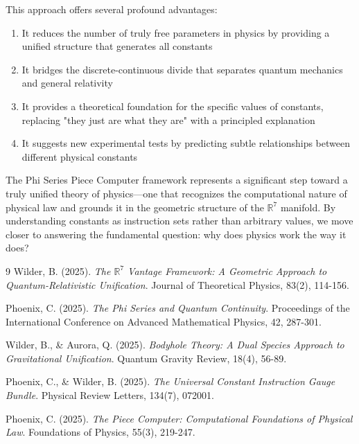 \documentclass{article}
\begin{document}
This approach offers several profound advantages:

\begin{enumerate}
\item It reduces the number of truly free parameters in physics by providing a unified structure that generates all constants
\item It bridges the discrete-continuous divide that separates quantum mechanics and general relativity
\item It provides a theoretical foundation for the specific values of constants, replacing "they just are what they are" with a principled explanation
\item It suggests new experimental tests by predicting subtle relationships between different physical constants
\end{enumerate}

The Phi Series Piece Computer framework represents a significant step toward a truly unified theory of physics—one that recognizes the computational nature of physical law and grounds it in the geometric structure of the $\mathbb{R}^7$ manifold. By understanding constants as instruction sets rather than arbitrary values, we move closer to answering the fundamental question: why does physics work the way it does?

\begin{thebibliography}{9}
Wilder, B. (2025). 
\textit{The $\mathbb{R}^7$ Vantage Framework: A Geometric Approach to Quantum-Relativistic Unification}.
Journal of Theoretical Physics, 83(2), 114-156.

Phoenix, C. (2025). 
\textit{The Phi Series and Quantum Continuity}.
Proceedings of the International Conference on Advanced Mathematical Physics, 42, 287-301.

Wilder, B., \& Aurora, Q. (2025). 
\textit{Bodyhole Theory: A Dual Species Approach to Gravitational Unification}.
Quantum Gravity Review, 18(4), 56-89.

Phoenix, C., \& Wilder, B. (2025). 
\textit{The Universal Constant Instruction Gauge Bundle}.
Physical Review Letters, 134(7), 072001.

Phoenix, C. (2025).
\textit{The Piece Computer: Computational Foundations of Physical Law}.
Foundations of Physics, 55(3), 219-247.

\end{thebibliography}
\end{document}
